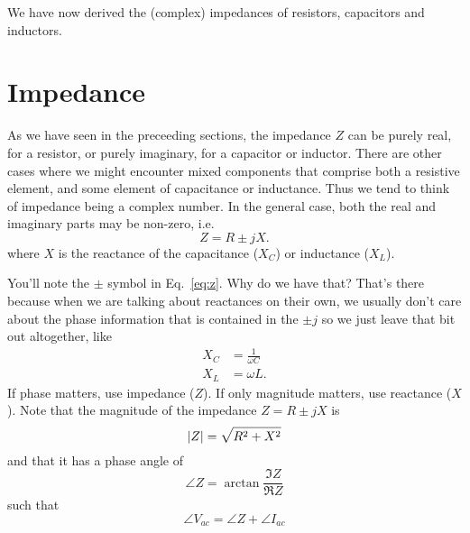 \documentclass{tufte-handout}
\newcommand{\vac}{V_{ac}}%
\newcommand{\iac}{I_{ac}}%
\begin{document}
We have now derived the (complex) impedances of resistors, capacitors and inductors.

\section{Impedance}
As we have seen in the preceeding sections, the impedance $Z$ can be purely real, for a resistor, or purely imaginary, for a capacitor or inductor. There are other cases where we might encounter mixed components that comprise both a resistive element, and some element of capacitance or inductance. Thus we tend to think of impedance being a complex number. In the general case, both the real and imaginary parts may be non-zero, i.e.
\begin{equation}
Z = R \pm jX.\label{eq:z}
\end{equation}
where $X$ is the reactance of the capacitance ($X_C$) or inductance ($X_L$).

You'll note the $\pm$ symbol in Eq.~\ref{eq:z}.  Why do we have that? That's there because when we are talking about reactances on their own, we usually don't care about the phase information that is contained in the $\pm j$ so we just leave that bit out altogether, like
\begin{align}
X_C &= \frac{1}{\omega C} \\
X_L &= \omega L.
\end{align}
If phase matters, use impedance ($Z$). If only magnitude matters, use reactance ($X$).
Note that the magnitude of the impedance $Z = R \pm jX$ is 
\begin{equation}
\abs{Z} = \sqrt{R^2 + X^2}
\end{equation}
and that it has a phase angle of
\begin{equation}
\angle{Z} = \arctan{\frac{\Im{Z}}{\Re{Z}}}
\end{equation}
such that 
\begin{equation}
\angle{\vac} = \angle{Z} + \angle{\iac}\label{eq:phaseoffset}
\end{equation}
\end{document}
